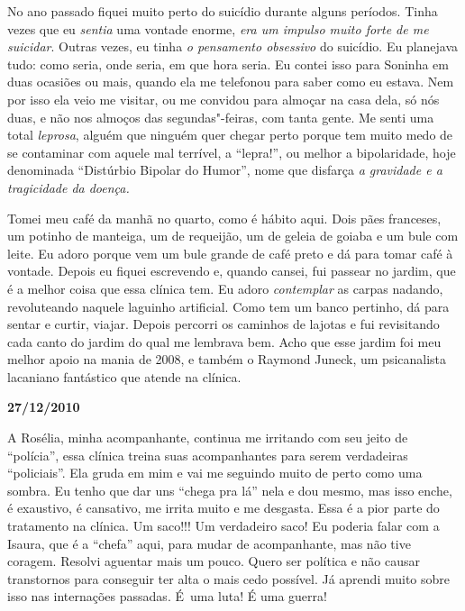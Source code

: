 No ano passado fiquei muito perto do suicídio durante alguns períodos.
Tinha vezes que eu \emph{sentia} uma vontade enorme, \emph{era um
impulso muito forte de me suicidar}. Outras vezes, eu tinha \emph{o
pensamento obsessivo}\textbf{} do suicídio. Eu planejava tudo: como
seria, onde seria, em que hora seria. Eu contei isso para Soninha em
duas ocasiões ou mais, quando ela me telefonou para saber como eu
estava. Nem por isso ela veio me visitar, ou me convidou para almoçar na
casa dela, só nós duas, e não nos almoços das segundas"-feiras, com tanta
gente. Me senti uma total \emph{leprosa}, alguém que ninguém quer chegar
perto porque tem muito medo de se contaminar com aquele mal terrível, a
``lepra!'', ou melhor a bipolaridade, hoje denominada ``Distúrbio
Bipolar do Humor'', nome que disfarça \emph{a gravidade e a tragicidade
da doença.}

Tomei meu café da manhã no quarto, como é hábito aqui. Dois pães
franceses, um potinho de manteiga, um de requeijão, um de geleia de
goiaba e um bule com leite. Eu adoro porque vem um bule grande de café
preto e dá para tomar café à vontade. Depois eu fiquei escrevendo e,
quando cansei, fui passear no jardim, que é a melhor coisa que essa
clínica tem. Eu adoro \emph{contemplar} as carpas nadando, revoluteando
naquele laguinho artificial. Como tem um banco pertinho, dá para sentar
e curtir, viajar. Depois percorri os caminhos de lajotas e fui
revisitando cada canto do jardim do qual me lembrava bem. Acho que esse
jardim foi meu melhor apoio na mania de 2008, e também o Raymond Juneck,
um psicanalista lacaniano fantástico que atende na clínica.

\begin{flushright}\textbf{27/12/2010}\end{flushright}


A Rosélia, minha acompanhante, continua me irritando com seu jeito de
``polícia'', essa clínica treina suas acompanhantes para serem
verdadeiras ``policiais''. Ela gruda em mim e vai me seguindo muito de
perto como uma sombra. Eu tenho que dar uns ``chega pra lá'' nela e dou
mesmo, mas isso enche, é exaustivo, é cansativo, me irrita muito e me
desgasta. Essa é a pior parte do tratamento na clínica. Um saco!!! Um
verdadeiro saco! Eu poderia falar com a Isaura, que é a ``chefa'' aqui,
para mudar de acompanhante, mas não tive coragem. Resolvi aguentar mais
um pouco. Quero ser política e não causar transtornos para conseguir ter
alta o mais cedo possível. Já aprendi muito sobre isso nas internações
passadas. É~uma luta! É uma guerra!

